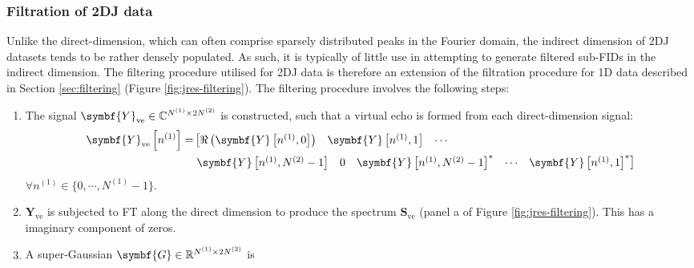 \subsubsection{Filtration of \ac{2DJ} data}
Unlike the direct-dimension, which can often comprise sparsely distributed
peaks in the Fourier domain, the indirect dimension of \ac{2DJ} datasets tends
to be rather densely populated. As such, it is typically of little use in
attempting to generate filtered sub-\acp{FID} in the indirect dimension. The
filtering procedure utilised for \ac{2DJ} data is therefore an extension of the
filtration procedure for \ac{1D} data described in Section \ref{sec:filtering}
(Figure \ref{fig:jres-filtering}). The filtering procedure involves the
following steps:
\begin{enumerate}
    \item The signal $\symbf{Y}_{\text{ve}} \in \mathbb{C}^{\None \times 2 \Ntwo}$ is
    constructed, such that a virtual echo is formed from each direct-dimension
    signal:
    \begin{equation}
        \begin{split}
            \symbf{Y}_{\text{ve}} \left[n^{(1)}\right] =
                &\left[
                \begin{matrix}
                    \Re\left(\symbf{Y}\left[n^{(1)}, 0\right]\right) &
                    \symbf{Y}\left[n^{(1)}, 1\right] &
                    \cdots
                \end{matrix}\right.
                \\
                &\left.
                \begin{matrix}
                    \symbf{Y}\left[n^{(1)}, \Ntwo - 1\right] &
                    0 &
                    \symbf{Y}\left[n^{(1)}, \Ntwo - 1\right]^* &
                    \cdots &
                    \symbf{Y}\left[n^{(1)}, 1\right]^*
                \end{matrix}
                \right]
        \end{split}
    \end{equation}
    $\forall n^{(1)} \in \lbrace 0, \cdots, N^{(1)} - 1 \rbrace$.
    \item $\symbf{Y}_{\text{ve}}$ is subjected to \ac{FT} along the direct
        dimension to produce the spectrum  $\symbf{S}_{\text{ve}}$ (panel a of
        Figure \ref{fig:jres-filtering}). This has a imaginary component of
        zeros.
    \item A super-Gaussian $\symbf{G} \in \mathbb{R}^{\None \times 2 \Ntwo}$ is

\end{enumerate}
